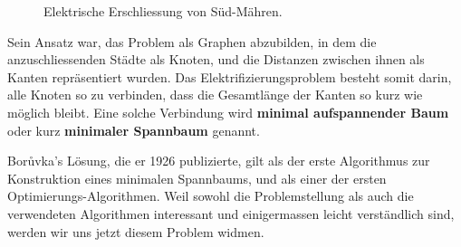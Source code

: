 \documentclass[12pt,a4paper]{report}
\theoremstyle{break}
\theoremstyle{plain}
\begin{document}
\begin{figure}[h!]
\caption{Elektrische Erschliessung von S\"{u}d-M\"{a}hren.\protect\footnotemark}
\end{figure}

Sein Ansatz war, das Problem als Graphen abzubilden, in dem die
anzuschliessenden St\"{a}dte als Knoten, und die Distanzen zwischen ihnen
als Kanten repr\"{a}sentiert wurden. Das Elektrifizierungsproblem
besteht somit darin, alle Knoten so zu verbinden, dass die
Gesamtl\"{a}nge der Kanten so kurz wie m\"{o}glich bleibt. Eine solche
Verbindung wird \textbf{minimal aufspannender Baum} oder kurz
\textbf{minimaler Spannbaum} genannt.

Bor\r{u}vka's L\"{o}sung, die er 1926 publizierte, gilt als der erste
Algorithmus zur Konstruktion eines minimalen Spannbaums, und als einer
der ersten Optimierungs-Algorithmen. Weil sowohl
die Problemstellung als auch die verwendeten Algorithmen interessant
und einigermassen leicht verst\"{a}ndlich sind, werden wir uns jetzt diesem Problem widmen.
\end{document}
